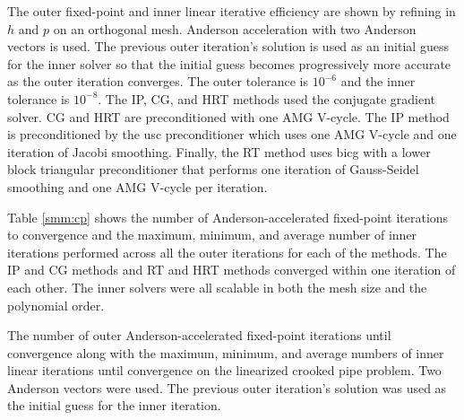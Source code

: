 \documentclass[../doc.tex]{subfiles}
\begin{document}
The outer fixed-point and inner linear iterative efficiency are shown by refining in $h$ and $p$ on an orthogonal mesh. Anderson acceleration with two Anderson vectors is used. The previous outer iteration's solution is used as an initial guess for the inner solver so that the initial guess becomes progressively more accurate as the outer iteration converges. The outer tolerance is $10^{-6}$ and the inner tolerance is $10^{-8}$. The IP, CG, and HRT methods used the conjugate gradient solver. CG and HRT are preconditioned with one AMG V-cycle. The IP method is preconditioned by the \gls{usc} preconditioner which uses one AMG V-cycle and one iteration of Jacobi smoothing. Finally, the RT method uses \gls{bicg} with a lower block triangular preconditioner that performs one iteration of Gauss-Seidel smoothing and one AMG V-cycle per iteration. 

Table \ref{smm:cp} shows the number of Anderson-accelerated fixed-point iterations to convergence and the maximum, minimum, and average number of inner iterations performed across all the outer iterations for each of the methods. The IP and CG methods and RT and HRT methods converged within one iteration of each other. The inner solvers were all scalable in both the mesh size and the polynomial order.  
\begin{table}
\centering
\caption{The number of outer Anderson-accelerated fixed-point iterations until convergence along with the maximum, minimum, and average numbers of inner linear iterations until convergence on the linearized crooked pipe problem. Two Anderson vectors were used. The previous outer iteration's solution was used as the initial guess for the inner iteration. }
\label{smm:cp}
\begin{adjustbox}{max width = \textwidth}

\end{adjustbox}
\end{table}
\end{document}
